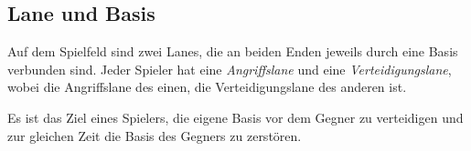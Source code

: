 \subsection{Lane und Basis}

Auf dem Spielfeld sind zwei Lanes, die an beiden Enden jeweils durch eine Basis
verbunden sind. Jeder Spieler hat eine
\emph{Angriffslane} und eine \emph{Verteidigungslane}, wobei die Angriffslane
des einen, die Verteidigungslane des anderen ist.

Es ist das Ziel eines Spielers, die eigene Basis vor dem Gegner zu verteidigen
und zur gleichen Zeit die Basis des Gegners zu zerstören.
